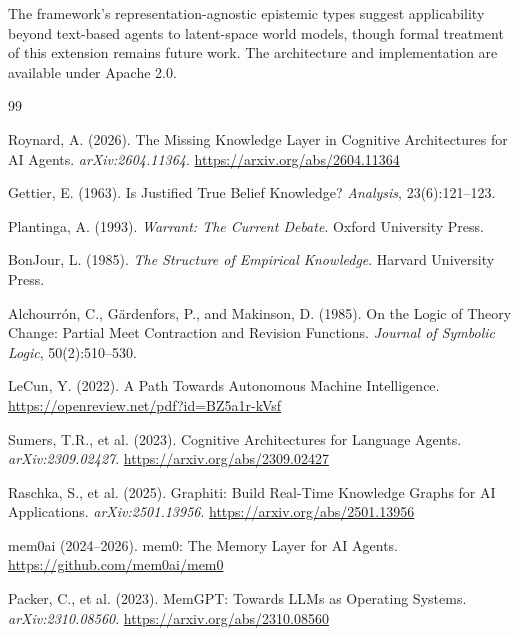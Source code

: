 \documentclass[11pt,letterpaper]{article}
\begin{document}
The framework's representation-agnostic epistemic types suggest applicability beyond text-based agents to latent-space world models, though formal treatment of this extension remains future work. The architecture and implementation are available under Apache 2.0.


\begin{thebibliography}{99}

Roynard, A. (2026).
\newblock The Missing Knowledge Layer in Cognitive Architectures for AI Agents.
\newblock \textit{arXiv:2604.11364}. \url{https://arxiv.org/abs/2604.11364}

Gettier, E. (1963).
\newblock Is Justified True Belief Knowledge?
\newblock \textit{Analysis}, 23(6):121--123.

Plantinga, A. (1993).
\newblock \textit{Warrant: The Current Debate}.
\newblock Oxford University Press.

BonJour, L. (1985).
\newblock \textit{The Structure of Empirical Knowledge}.
\newblock Harvard University Press.

Alchourr{\'o}n, C., G{\"a}rdenfors, P., and Makinson, D. (1985).
\newblock On the Logic of Theory Change: Partial Meet Contraction and Revision Functions.
\newblock \textit{Journal of Symbolic Logic}, 50(2):510--530.

LeCun, Y. (2022).
\newblock A Path Towards Autonomous Machine Intelligence.
\newblock \url{https://openreview.net/pdf?id=BZ5a1r-kVsf}

Sumers, T.R., et al. (2023).
\newblock Cognitive Architectures for Language Agents.
\newblock \textit{arXiv:2309.02427}. \url{https://arxiv.org/abs/2309.02427}

Raschka, S., et al. (2025).
\newblock Graphiti: Build Real-Time Knowledge Graphs for AI Applications.
\newblock \textit{arXiv:2501.13956}. \url{https://arxiv.org/abs/2501.13956}

mem0ai (2024--2026).
\newblock mem0: The Memory Layer for AI Agents.
\newblock \url{https://github.com/mem0ai/mem0}

Packer, C., et al. (2023).
\newblock MemGPT: Towards LLMs as Operating Systems.
\newblock \textit{arXiv:2310.08560}. \url{https://arxiv.org/abs/2310.08560}


\end{thebibliography}
\end{document}
